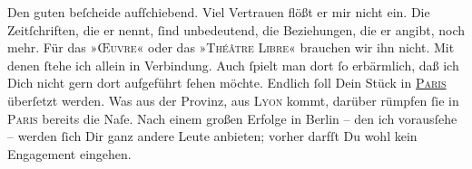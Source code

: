 \pstart
           Den guten \label{K_L02762-4v}\label{K_L02762-4} beſcheide aufſchiebend. Viel Vertrauen flößt er mir nicht ein. Die
               Zeitſchriften, die er  nennt,{ }ſind unbedeutend,
               die  Beziehungen, die er angibt, noch mehr. Für
               das »\textsc{Œuvre}« oder das »\textsc{Théâtre Libre}« brauchen wir ihn nicht. Mit denen{ }ſtehe ich allein in Verbindung. Auch{ }ſpielt
               man dort{ }ſo erbärmlich, daß ich Dich nicht gern dort aufgeführt{ }ſehen {\pb}möchte. Endlich{ }ſoll Dein Stück in \textsc{\uline{Paris}} überſetzt werden. Was aus der Provinz, aus \textsc{Lyon} kommt, darüber rümpfen{ }ſie in \textsc{Paris} bereits die Naſe. Nach einem großen Erfolge in Berlin – den ich \strikeout{\textcolor{gray}{×}} vorausſehe – werden{ }ſich Dir ganz andere Leute anbieten; vorher darfſt Du wohl
               kein Engagement eingehen.\pend
           
